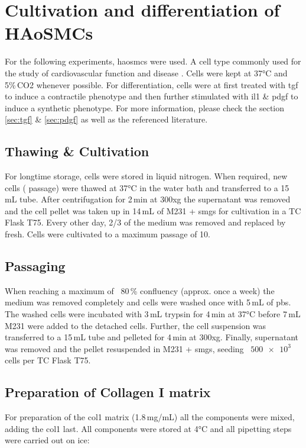 \section{Cultivation and differentiation of HAoSMCs}
\label{sec:cultivation}
For the following experiments, \acfp{haosmc} were used. A cell type commonly used for the study of cardiovascular function and disease \cite{[Reference for this claim]}. Cells were kept at 37°C and 5\%\,CO2 whenever possible. For differentiation, cells were at first treated with \ac{tgf} to induce a contractile phenotype and then further stimulated with \ac{il1} \& \ac{pdgf} to induce a synthetic phenotype. For more information, please check the section \ref{sec:tgf} \&  \ref{sec:pdgf} as well as the referenced literature.

    \subsection{Thawing \& Cultivation}
    For longtime storage, cells were stored in liquid nitrogen. When required, new cells ( passage) were thawed at 37°C in the water bath and transferred to a 15\,mL tube. After centrifugation for 2\,min at 300xg the supernatant was removed and the cell pellet was taken up in 14\,mL of \ac{M231} + \ac{smgs} for cultivation in a TC Flask T75. Every other day, 2/3 of the medium was removed and replaced by fresh. Cells were cultivated to a maximum passage of 10.

    \subsection{Passaging}
    When reaching a maximum of ~80\,\% confluency (approx. once a week) the medium was removed completely and cells were washed once with 5\,mL of \ac{pbs}. The washed cells were incubated with 3\,mL trypsin for 4\,min at 37°C before 7\,mL \ac{M231} were added to the detached cells. Further, the cell suspension was transferred to a 15\,mL tube and pelleted for 4\,min at 300xg. Finally, supernatant was removed and the pellet resuspended in \ac{M231} + \ac{smgs}, seeding ~$\num{500e3}$ cells per TC Flask T75.

    \subsection{Preparation of Collagen I matrix}
    \label{subsec:matrix}
    For preparation of the \ac{col1} matrix (1.8\,mg/mL) all the components were mixed, adding the \ac{col1} last. All components were stored at 4°C and all pipetting steps were carried out on ice:

